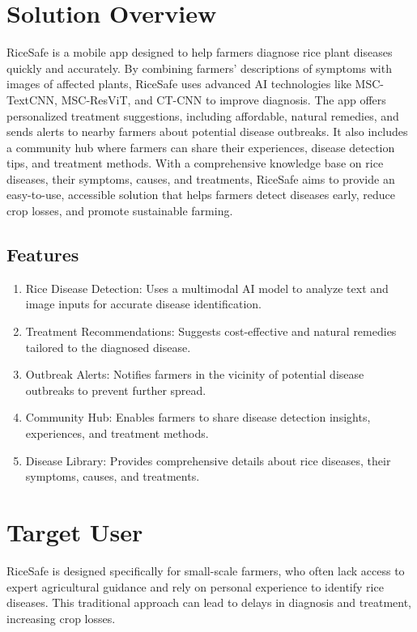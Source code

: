 \section{Solution Overview}
\label{section:solution-overview}

RiceSafe is a mobile app designed to help farmers diagnose rice plant diseases quickly and accurately. By combining farmers’ descriptions of symptoms with images of affected plants, RiceSafe uses advanced AI technologies like MSC-TextCNN, MSC-ResViT, and CT-CNN to improve diagnosis. The app offers personalized treatment suggestions, including affordable, natural remedies, and sends alerts to nearby farmers about potential disease outbreaks. It also includes a community hub where farmers can share their experiences, disease detection tips, and treatment methods. With a comprehensive knowledge base on rice diseases, their symptoms, causes, and treatments, RiceSafe aims to provide an easy-to-use, accessible solution that helps farmers detect diseases early, reduce crop losses, and promote sustainable farming.

\subsection{Features}
\label{subsection:features}

\begin{enumerate}[leftmargin=80pt]
    \item Rice Disease Detection: Uses a multimodal AI model to analyze text and image inputs for accurate disease identification.
    \item Treatment Recommendations: Suggests cost-effective and natural remedies tailored to the diagnosed disease.
    \item Outbreak Alerts: Notifies farmers in the vicinity of potential disease outbreaks to prevent further spread.
    \item Community Hub: Enables farmers to share disease detection insights, experiences, and treatment methods.
    \item Disease Library: Provides comprehensive details about rice diseases, their symptoms, causes, and treatments.
\end{enumerate}

\section{Target User}
\label{section:target-user}

RiceSafe is designed specifically for small-scale farmers, who often lack access to expert agricultural guidance and rely on personal experience to identify rice diseases. This traditional approach can lead to delays in diagnosis and treatment, increasing crop losses.

